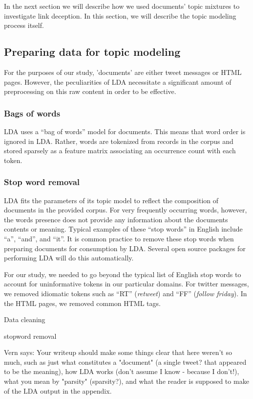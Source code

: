 \documentclass[times, 11pt, twocolumn]{article}
\begin{document}
In the next section we will describe how we used documents' topic mixtures to investigate link deception.
In this section, we will describe the topic modeling process itself.


\subsection{Preparing data for topic modeling}

For the purposes of our study, 'documents' are either tweet messages or HTML pages.
However, the peculiarities of LDA necessitate a significant amount of preprocessing on this raw content in order to be effective.

\subsubsection{Bags of words}

LDA uses a ``bag of words'' model for documents.
This means that word order is ignored in LDA.
Rather, words are tokenized from records in the corpus and stored sparsely as a feature matrix associating an occurrence count with each token.

\subsubsection{Stop word removal}

LDA fits the parameters of its topic model to reflect the composition of documents in the provided corpus.
For very frequently occurring words, however, the words presence does not provide any information about the documents contents or meaning.
Typical examples of these ``stop words'' in English include ``a'', ``and'', and ``it''.
It is common practice to remove these stop words when preparing documents for consumption by LDA.
Several open source packages for performing LDA will do this automatically.

For our study, we needed to go beyond the typical list of English stop words to account for uninformative tokens in our particular domains.
For twitter messages, we removed idiomatic tokens such as ``RT'' (\emph{retweet}) and ``FF'' (\emph{follow friday}).
In the HTML pages, we removed common HTML tags.


Data cleaning 

stopword removal



Vern says: Your writeup should make some things clear that here weren't so much, such as just what constitutes a "document" (a single tweet? that appeared to be the meaning), how LDA works (don't assume I know - because I don't!), what you mean by "parsity" (sparsity?), and what the reader is supposed to make of the      LDA output in the appendix.
\end{document}
